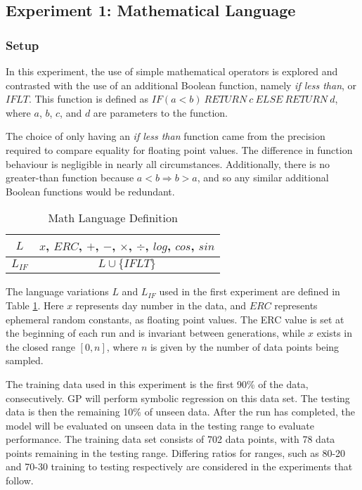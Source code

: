 \documentclass[12pt, letterpaper]{article}
\begin{document}
\subsection{Experiment 1: Mathematical Language}

\subsubsection{Setup}
\textrm{\indent In this experiment, the use of simple mathematical operators is explored and contrasted with the use of an additional Boolean function, namely \textit{if less than}, or $IFLT$. This function is defined as $ IF(a<b)\ RETURN\ c\ ELSE\ RETURN\ d$, where $a$, $b$, $c$, and $d$ are parameters to the function. }

\textrm{ \indent The choice of only having an \textit{if less than} function came from the precision required to compare equality for floating point values. The difference in function behaviour is negligible in nearly all circumstances. Additionally, there is no greater-than function because $a<b \Rightarrow b>a$, and so any similar additional Boolean functions would be redundant. }

\begin{table}[h!]
\centering
\begin{tabular}{||c|c||}
\hline
$L$ & $x$, $ERC$, $+$, $-$, $\times$, $\div$, $log$, $cos$, $sin$ \\
\hline
$L_{IF}$ & $L \cup \{ IFLT \} $ \\
\hline
\end{tabular}
\caption{Math Language Definition}
\label{math-lang}
\end{table}

\textrm{ \indent The language variations $L$ and $L_{IF}$ used in the first experiment are defined in Table \ref{math-lang}. Here $x$ represents day number in the data, and $ERC$ represents ephemeral random constants, as floating point values. The ERC value is set at the beginning of each run and is invariant between generations, while $x$ exists in the closed range $[0, n]$, where $n$ is given by the number of data points being sampled. }

\textrm{\indent The training data used in this experiment is the first 90\% of the data, consecutively. GP will perform symbolic regression on this data set. The testing data is then the remaining 10\% of unseen data. After the run has completed, the model will be evaluated on unseen data in the testing range to evaluate performance. The training data set consists of 702 data points, with 78 data points remaining in the testing range. Differing ratios for ranges, such as 80-20 and 70-30 training to testing respectively are considered in the experiments that follow. }
\end{document}
